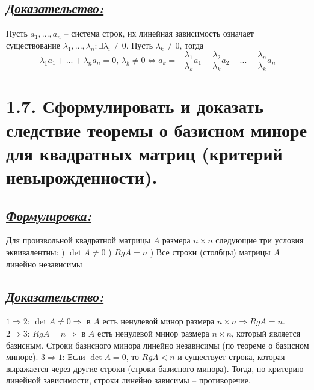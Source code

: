 \documentclass{article}
\begin{document}
\subsection*{\Large \underline{\textit{Доказательство: }}}
Пусть $a_1, ..., a_n$ -- система строк, их линейная зависимость означает существование $\lambda_1, ..., \lambda_n : \exists \lambda_i \ne 0$. Пусть $\lambda_k \ne 0$, тогда 
$$
\lambda_1a_1 + ... + \lambda_na_n = 0,\, \lambda_k \ne 0 \Leftrightarrow a_k = -\frac{\lambda_1}{\lambda_k}a_1 - \frac{\lambda_2}{\lambda_k}a_2 - ... - \frac{\lambda_n}{\lambda_k}a_n
$$

\section*{\LARGE 1.7. Сформулировать и доказать следствие теоремы о базисном миноре для квадратных матриц (критерий невырожденности).}
\subsection*{\Large \underline{\textit{Формулировка: }}}
Для произвольной квадратной матрицы $A$ размера $n \times n$ следующие три условия эквивалентны:
) $\det{A} \ne 0$
) $RgA = n$
) Все строки (столбцы) матрицы $A$ линейно независимы

\subsection*{\Large \underline{\textit{Доказательство: }}}
\underline{$1 \Rightarrow 2$}:
\newline $\det{A} \ne 0 \Rightarrow $ в $A$ есть ненулевой минор размера $n \times n \Rightarrow RgA = n$.
\newline  \underline{$2 \Rightarrow 3$}:
\newline $RgA = n \Rightarrow $ в $A$ есть ненулевой минор размера $n \times n$, который является базисным. Строки базисного минора линейно независимы (по теореме о базисном миноре).
\newline \underline{$3 \Rightarrow 1$}:
\newline Если $\det{A} = 0$, то $RgA < n$ и существует строка, которая выражается через другие строки (строки базисного минора). Тогда, по критерию линейной зависимости, строки линейно зависимы -- противоречие.
\end{document}
